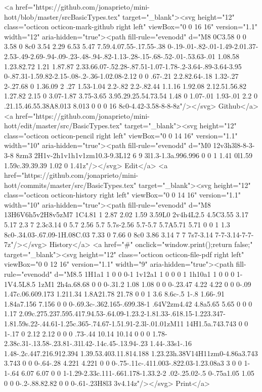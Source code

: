       <a href="https://github.com/jonaprieto/mini-hott/blob/master/srcBasicTypes.tex" target="_blank"><svg height="12" class="octicon octicon-mark-github right left" viewBox="0 0 16 16" version="1.1" width="12" aria-hidden="true"><path fill-rule="evenodd" d="M8 0C3.58 0 0 3.58 0 8c0 3.54 2.29 6.53 5.47 7.59.4.07.55-.17.55-.38 0-.19-.01-.82-.01-1.49-2.01.37-2.53-.49-2.69-.94-.09-.23-.48-.94-.82-1.13-.28-.15-.68-.52-.01-.53.63-.01 1.08.58 1.23.82.72 1.21 1.87.87 2.33.66.07-.52.28-.87.51-1.07-1.78-.2-3.64-.89-3.64-3.95 0-.87.31-1.59.82-2.15-.08-.2-.36-1.02.08-2.12 0 0 .67-.21 2.2.82.64-.18 1.32-.27 2-.27.68 0 1.36.09 2 .27 1.53-1.04 2.2-.82 2.2-.82.44 1.1.16 1.92.08 2.12.51.56.82 1.27.82 2.15 0 3.07-1.87 3.75-3.65 3.95.29.25.54.73.54 1.48 0 1.07-.01 1.93-.01 2.2 0 .21.15.46.55.38A8.013 8.013 0 0 0 16 8c0-4.42-3.58-8-8-8z"/></svg> Github</a>
      <a href="https://github.com/jonaprieto/mini-hott/edit/master/src/BasicTypes.tex" target="_blank"><svg height="12" class="octicon octicon-pencil right left" viewBox="0 0 14 16" version="1.1" width="10" aria-hidden="true"><path fill-rule="evenodd" d="M0 12v3h3l8-8-3-3-8 8zm3 2H1v-2h1v1h1v1zm10.3-9.3L12 6 9 3l1.3-1.3a.996.996 0 0 1 1.41 0l1.59 1.59c.39.39.39 1.02 0 1.41z"/></svg> Edit</a>
      <a href="https://github.com/jonaprieto/mini-hott/commits/master/src/BasicTypes.tex" target="_blank"><svg height="12" class="octicon octicon-history right left" viewBox="0 0 14 16" version="1.1" width="10" aria-hidden="true"><path fill-rule="evenodd" d="M8 13H6V6h5v2H8v5zM7 1C4.81 1 2.87 2.02 1.59 3.59L0 2v4h4L2.5 4.5C3.55 3.17 5.17 2.3 7 2.3c3.14 0 5.7 2.56 5.7 5.7s-2.56 5.7-5.7 5.7A5.71 5.71 0 0 1 1.3 8c0-.34.03-.67.09-1H.08C.03 7.33 0 7.66 0 8c0 3.86 3.14 7 7 7s7-3.14 7-7-3.14-7-7-7z"/></svg> History</a>
      <a  href="#" onclick="window.print();return false;" target="_blank"><svg height="12" class="octicon octicon-file-pdf right left" viewBox="0 0 12 16" version="1.1" width="9" aria-hidden="true"><path fill-rule="evenodd" d="M8.5 1H1a1 1 0 0 0-1 1v12a1 1 0 0 0 1 1h10a1 1 0 0 0 1-1V4.5L8.5 1zM1 2h4a.68.68 0 0 0-.31.2 1.08 1.08 0 0 0-.23.47 4.22 4.22 0 0 0-.09 1.47c.06.609.173 1.211.34 1.8A21.78 21.78 0 0 1 3.6 8.6c-.5 1-.8 1.66-.91 1.84a7.156 7.156 0 0 0-.69.3c-.362.165-.699.38-1 .64V2zm4.42 4.8a5.65 5.65 0 0 0 1.17 2.09c.275.237.595.417.94.53-.64.09-1.23.2-1.81.33-.618.15-1.223.347-1.81.59s.22-.44.61-1.25c.365-.74.67-1.51.91-2.3l-.01.01zM11 14H1.5a.743.743 0 0 1-.17 0 2.12 2.12 0 0 0 .73-.44 10.14 10.14 0 0 0 1.78-2.38c.31-.13.58-.23.81-.31l.42-.14c.45-.13.94-.23 1.44-.33s1-.16 1.48-.2c.447.216.912.394 1.39.53.403.11.814.188 1.23.23h.38V14H11zm0-4.86a3.743 3.743 0 0 0-.64-.28 4.221 4.221 0 0 0-.75-.11c-.411.003-.822.03-1.23.08a3 3 0 0 1-1-.64 6.07 6.07 0 0 1-1.29-2.33c.111-.661.178-1.33.2-2 .02-.25.02-.5 0-.75a1.05 1.05 0 0 0-.2-.88.82.82 0 0 0-.61-.23H8l3 3v4.14z"/></svg> Print</a>
